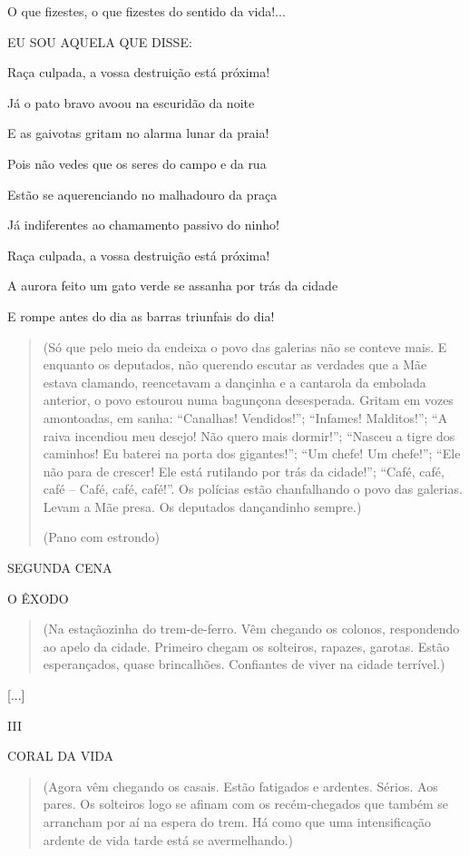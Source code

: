 O que fizestes, o que fizestes do sentido da vida!...

EU SOU AQUELA QUE DISSE:

Raça culpada, a vossa destruição está próxima!

Já o pato bravo avoou na escuridão da noite

E as gaivotas gritam no alarma lunar da praia!

Pois não vedes que os seres do campo e da rua

Estão se aquerenciando no malhadouro da praça

Já indiferentes ao chamamento passivo do ninho!

Raça culpada, a vossa destruição está próxima!

A aurora feito um gato verde se assanha por trás da cidade

E rompe antes do dia as barras triunfais do dia!

\begin{quote}
(Só que pelo meio da endeixa o povo das galerias não se conteve mais. E
enquanto os deputados, não querendo escutar as verdades que a Mãe estava
clamando, reencetavam a dançinha e a cantarola da embolada anterior, o
povo estourou numa bagunçona desesperada. Gritam em vozes amontoadas, em
sanha: ``Canalhas! Vendidos!''; ``Infames! Malditos!''; ``A raiva
incendiou meu desejo! Não quero mais dormir!''; ``Nasceu a tigre dos
caminhos! Eu baterei na porta dos gigantes!''; ``Um chefe! Um chefe!'';
``Ele não para de crescer! Ele está rutilando por trás da cidade!'';
``Café, café, café -- Café, café, café!''. Os polícias estão
chanfalhando o povo das galerias. Levam a Mãe presa. Os deputados
dançandinho sempre.)

(Pano com estrondo)
\end{quote}

\textsc{SEGUNDA CENA}

\textsc{O ÊXODO}

\begin{quote}
(Na estaçãozinha do trem-de-ferro. Vêm chegando os colonos, respondendo
ao apelo da cidade. Primeiro chegam os solteiros, rapazes, garotas.
Estão esperançados, quase brincalhões. Confiantes de viver na cidade
terrível.)
\end{quote}

{[}...{]}

III

\textsc{CORAL DA VIDA}

\begin{quote}
(Agora vêm chegando os casais. Estão fatigados e ardentes. Sérios. Aos
pares. Os solteiros logo se afinam com os recém-chegados que também se
arrancham por aí na espera do trem. Há como que uma intensificação
ardente de vida tarde está se avermelhando.)
\end{quote}

